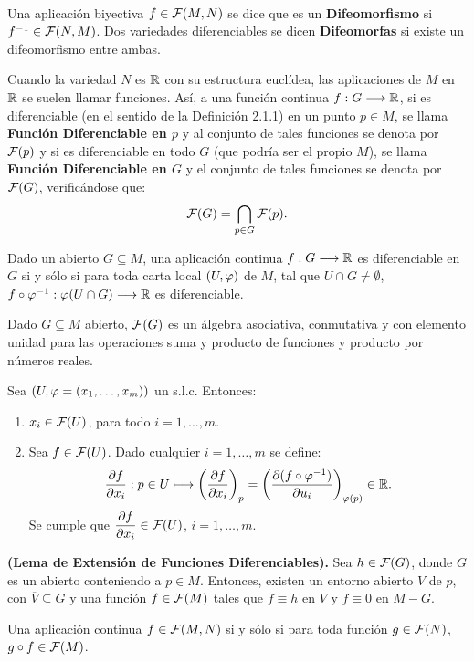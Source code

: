 \documentclass[cursovd_portada.tex]{subfiles}
\begin{document}
\

\begin{defi} Una aplicación biyectiva $f\in{\cal F}(M,N)$ se dice que es un {\bf Difeomorfismo} si
$f^{-1}\in{\cal F}(N,M)$. Dos variedades diferenciables se dicen
{\bf Difeomorfas} si existe un difeomorfismo entre ambas.
\end{defi}
Cuando la variedad $N$ es $\mathbb{R}$ con su estructura euclídea, las aplicaciones de $M$ en $\mathbb{R}$ se suelen llamar
funciones. Así, a una función continua $f:G\longrightarrow\mathbb{R}$, si es diferenciable (en el sentido de la Definición 2.1.1) en
un punto $p\in M$, se llama {\bf Función Diferenciable en $p$} y al conjunto de tales funciones se denota por
${\cal F}(p)$ y si es diferenciable en todo $G$ (que podría ser el propio $M$), se llama {\bf Función Diferenciable
en $G$} y el conjunto de tales funciones se denota por ${\cal F}(G)$, verificándose que:
$${\cal F}(G)=\bigcap_{p\in G}{\cal F}(p).$$
\begin{prop}
Dado un abierto $G\subseteq M$, una aplicación continua $f:G\longrightarrow\mathbb{R}$ es diferenciable en $G$ si y sólo si para toda
carta local $(U,\varphi)$ de $M$, tal que $U\cap G\neq\emptyset$, $f\circ\varphi^{-1}:\varphi(U\cap G)\longrightarrow\mathbb{R}$ es diferenciable.
\end{prop}
\begin{prop}
Dado $G\subseteq M$ abierto, ${\cal F}(G)$ es un álgebra asociativa, conmutativa y con elemento unidad para las
operaciones suma y producto de funciones y producto por números reales.
\end{prop}
\begin{ejs}
{\rm Sea $(U,\varphi=(x_1,\dots ,x_m))$ un s.l.c. Entonces:
\begin{enumerate}
\item $x_i\in{\cal F}(U)$, para todo $i=1,\dots ,m$.
\item Sea $f\in{\cal F}(U)$. Dado cualquier $i=1,\dots ,m$ se define:
$$\displaystyle{\frac{\partial f}{\partial x_i}}:p\in U\longmapsto \left(\displaystyle{\frac{\partial f}{\partial x_i}}\right)_p=\left(\displaystyle{\frac{\partial (f\circ\varphi^{-1})}{\partial u_i}}\right)_{\varphi(p)}\in\mathbb{R}.$$
\hs Se cumple que $\displaystyle{\displaystyle{\frac{\partial f}{\partial x_i}}}\in{\cal F}(U)$, $i=1,\dots ,m$.
\end{enumerate}}
\end{ejs}
\begin{prop}
{\bf (Lema de Extensión de Funciones Diferenciables).} Sea $h\in{\cal F}(G)$, donde $G$ es un abierto conteniendo a
$p\in M$. Entonces, existen un entorno abierto $V$ de $p$, con $\overline{V}\subseteq G$ y una función
$f\in{\cal F}(M)$ tales que $f\equiv h$ en $V$ y $f\equiv 0$ en $M-G$.
\end{prop}
\begin{teorema}
Una aplicación continua $f\in{\cal F}(M,N)$ si y sólo si
para toda función $g\in{\cal F}(N)$, $g\circ f\in{\cal F}(M)$.
\end{teorema}
\end{document}
